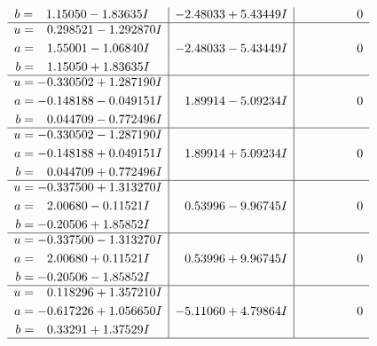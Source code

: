 \documentclass[1p]{elsarticle_modified}
\theoremstyle{definition}
\begin{document}
$$\begin{array}{c|c|c}
\begin{aligned}
b &= \phantom{-}1.15050 - 1.83635 I\end{aligned}
 & -2.48033 + 5.43449 I & \phantom{-0.000000 } 0 \\ \hline\begin{aligned}
u &= \phantom{-}0.298521 - 1.292870 I \\
a &= \phantom{-}1.55001 - 1.06840 I \\
b &= \phantom{-}1.15050 + 1.83635 I\end{aligned}
 & -2.48033 - 5.43449 I & \phantom{-0.000000 } 0 \\ \hline\begin{aligned}
u &= -0.330502 + 1.287190 I \\
a &= -0.148188 - 0.049151 I \\
b &= \phantom{-}0.044709 - 0.772496 I\end{aligned}
 & \phantom{-}1.89914 - 5.09234 I & \phantom{-0.000000 } 0 \\ \hline\begin{aligned}
u &= -0.330502 - 1.287190 I \\
a &= -0.148188 + 0.049151 I \\
b &= \phantom{-}0.044709 + 0.772496 I\end{aligned}
 & \phantom{-}1.89914 + 5.09234 I & \phantom{-0.000000 } 0 \\ \hline\begin{aligned}
u &= -0.337500 + 1.313270 I \\
a &= \phantom{-}2.00680 - 0.11521 I \\
b &= -0.20506 + 1.85852 I\end{aligned}
 & \phantom{-}0.53996 - 9.96745 I & \phantom{-0.000000 } 0 \\ \hline\begin{aligned}
u &= -0.337500 - 1.313270 I \\
a &= \phantom{-}2.00680 + 0.11521 I \\
b &= -0.20506 - 1.85852 I\end{aligned}
 & \phantom{-}0.53996 + 9.96745 I & \phantom{-0.000000 } 0 \\ \hline\begin{aligned}
u &= \phantom{-}0.118296 + 1.357210 I \\
a &= -0.617226 + 1.056650 I \\
b &= \phantom{-}0.33291 + 1.37529 I\end{aligned}
 & -5.11060 + 4.79864 I & \phantom{-0.000000 } 0\\
 \hline 
 \end{array}$$\newpage$$\begin{array}{c|c|c}  

\end{array}$$
\end{document}
